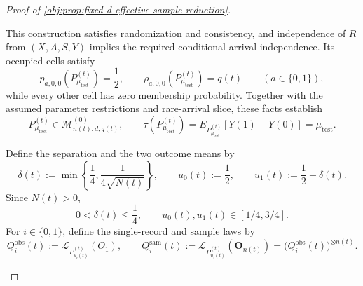 \begin{proof}[Proof of \cref{obj:prop:fixed-d-effective-sample-reduction}]
\begin{enumerate}
This construction satisfies randomization and consistency, and independence
of \(R\) from \((X,A,S,Y)\) implies the required conditional arrival independence.
Its occupied cells satisfy
\[
p_{a,0,0}(P_{\mu_{\mathrm{test}}}^{(t)})=\frac12,
\qquad
\rho_{a,0,0}(P_{\mu_{\mathrm{test}}}^{(t)})=q(t)
\qquad(a\in\{0,1\}),
\]
while every other cell has zero membership probability. Together with the
assumed parameter restrictions and rare-arrival slice, these facts establish
\[
P_{\mu_{\mathrm{test}}}^{(t)}\in\mathcal M^{(0)}_{n(t),d,q(t)},
\qquad
\tau(P_{\mu_{\mathrm{test}}}^{(t)})
=
E_{P_{\mu_{\mathrm{test}}}^{(t)}}[Y(1)-Y(0)]
=
\mu_{\mathrm{test}}.
\]

Define the separation and the two outcome means by
\[
\delta(t)
:=
\min\left\{\frac14,\frac{1}{4\sqrt{N(t)}}\right\},
\qquad
u_0(t):=\frac12,
\qquad
u_1(t):=\frac12+\delta(t).
\]
Since \(N(t)>0\),
\[
0<\delta(t)\le\frac14,
\qquad
u_0(t),u_1(t)\in[1/4,3/4].
\]
For \(i\in\{0,1\}\), define the single-record and sample laws by
\[
Q_i^{\mathrm{obs}}(t)
:=
\mathcal L_{P_{u_i(t)}^{(t)}}(O_1),
\qquad
Q_i^{\mathrm{sam}}(t)
:=
\mathcal L_{P_{u_i(t)}^{(t)}}(\mathbf O_{n(t)})
=
\bigl(Q_i^{\mathrm{obs}}(t)\bigr)^{\otimes n(t)}.
\]


\end{enumerate}
\end{proof}
